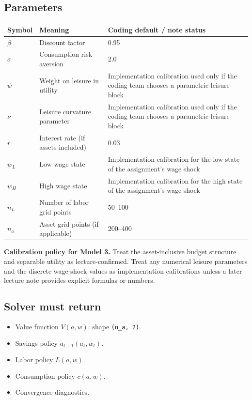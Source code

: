 \documentclass[11pt]{article}
\begin{document}
\subsection{Parameters}

\begin{tabularx}{\linewidth}{@{}lXl@{}}
\toprule
\textbf{Symbol} & \textbf{Meaning} & \textbf{Coding default / note status} \\
\midrule
$\beta$ & Discount factor & 0.95 \\
$\sigma$ & Consumption risk aversion & 2.0 \\
$\psi$ & Weight on leisure in utility & Implementation calibration used only if the coding team chooses a parametric leisure block \\
$\nu$ & Leisure curvature parameter & Implementation calibration used only if the coding team chooses a parametric leisure block \\
$r$ & Interest rate (if assets included) & 0.03 \\
$w_L$ & Low wage state & Implementation calibration for the low state of the assignment's wage shock \\
$w_H$ & High wage state & Implementation calibration for the high state of the assignment's wage shock \\
$n_L$ & Number of labor grid points & 50--100 \\
$n_a$ & Asset grid points (if applicable) & 200--400 \\
\bottomrule
\end{tabularx}

\begin{notebox}
\textbf{Calibration policy for Model 3.} Treat the asset-inclusive budget structure and separable utility as lecture-confirmed. Treat any numerical leisure parameters and the discrete wage-shock values as implementation calibrations unless a later lecture note provides explicit formulas or numbers.
\end{notebox}

\subsection{Solver must return}
\begin{itemize}
    \item Value function $V(a,w)$: shape \texttt{(n\_a, 2)}.
    \item Savings policy $a_{t+1}(a_t,w_t)$.
    \item Labor policy $L(a,w)$.
    \item Consumption policy $c(a,w)$.
    \item Convergence diagnostics.
\end{itemize}
\end{document}
